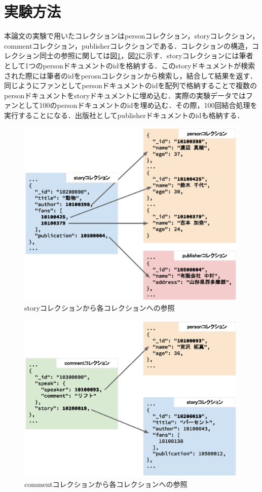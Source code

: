 \documentclass[a4paper,11pt]{ujreport}
\begin{document}
\section{実験方法}
本論文の実験で用いたコレクションはpersonコレクション，storyコレクション，commentコレクション，publisherコレクションである．コレクションの構造，コレクション同士の参照に関しては図\ref{ExperimentCollection}，図\ref{ExperimentCollection2}に示す．storyコレクションには筆者として1つのpersonドキュメントのidを格納する．このstoryドキュメントが検索された際には筆者のidをperosnコレクションから検索し，結合して結果を返す．同じようにファンとしてpersonドキュメントのidを配列で格納することで複数のpersonドキュメントをstoryドキュメントに埋め込む．実際の実験データではファンとして100のpersonドキュメントのidを埋め込む．その際，100回結合処理を実行することになる．出版社としてpublisherドキュメントのidも格納する．
\begin{figure}[htbp]
	\begin{center}
		\includegraphics[width=30em, trim=10em 2em 10em 2em]{src/ExperimentCollection.eps} %
	\end{center}
	\caption{storyコレクションから各コレクションへの参照}
	\label{ExperimentCollection}
\end{figure}
\begin{figure}[htbp]
	\begin{center}
		\includegraphics[width=30em, trim=10em 2em 10em 2em]{src/ExperimentCollection2.eps} %
	\end{center}
	\caption{commentコレクションから各コレクションへの参照}
	\label{ExperimentCollection2}
\end{figure}
\end{document}
